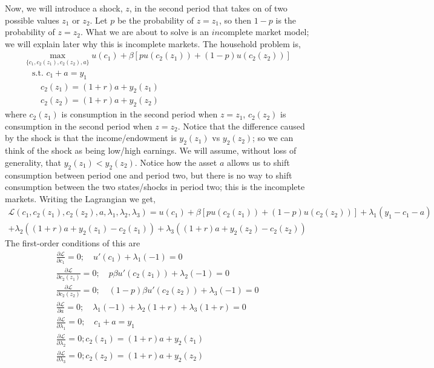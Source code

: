 Now, we will introduce a shock, $z$, in the second period that takes on of two possible values $z_1$ or $z_2$. Let $p$ be the probability of $z=z_1$, so then $1-p$ is the probability of $z=z_2$. What we are about to solve is an $in$complete market model; we will explain later why this is incomplete markets. The household problem is,
\begin{eqnarray*}
 \max_{\{c_1,c_2(z_1),c_2(z_2),a\}} u(c_1)+\beta [p u(c_2(z_1)) +(1-p)u(c_2(z_2))]\\
 \quad \text{s.t. } c_1+a=y_1 \\
 \quad \quad c_2(z_1)=(1+r)a+y_2(z_1) \\
 \quad \quad c_2(z_2)=(1+r)a+y_2(z_2)
\end{eqnarray*}
where $c_2(z_1)$ is consumption in the second period when $z=z_1$, $c_2(z_2)$ is consumption in the second period when $z=z_2$. Notice that the difference caused by the shock is that the income/endowment is $y_2(z_1)$ vs $y_2(z_2)$; so we can think of the shock as being low/high earnings. We will assume, without loss of generality, that $y_2(z_1)<y_2(z_2)$. Notice how the asset $a$ allows us to shift consumption between period one and period two, but there is no way to shift consumption between the two states/shocks in period two; this is the incomplete markets. Writing the Lagrangian we get,
\begin{eqnarray*}
 \mathcal{L}(c_1,c_2(z_1),c_2(z_2),a,\lambda_1,\lambda_2,\lambda_3)= u(c_1)+\beta [p u(c_2(z_1)) +(1-p)u(c_2(z_2))] + \lambda_1(y_1-c_1-a) \\
 +\lambda_2((1+r)a+y_2(z_1)-c_2(z_1)) +\lambda_3((1+r)a+y_2(z_2)-c_2(z_2))
\end{eqnarray*}
The first-order conditions of this are
\begin{eqnarray*}
 \frac{\partial \mathcal{L}}{\partial c_1}=0; \quad u'(c_1)+\lambda_1(-1)=0 \\
 \frac{\partial \mathcal{L}}{\partial c_2(z_1)}=0; \quad p \beta u'(c_2(z_1))+\lambda_2(-1)=0 \\
 \frac{\partial \mathcal{L}}{\partial c_2(z_2)}=0; \quad (1-p) \beta u'(c_2(z_2))+\lambda_3(-1)=0 \\
 \frac{\partial \mathcal{L}}{\partial a}=0; \quad \lambda_1(-1)+\lambda_2 (1+r)+\lambda_3 (1+r)=0 \\
 \frac{\partial \mathcal{L}}{\partial \lambda_1}=0; \quad c_1+a=y_1 \\
 \frac{\partial \mathcal{L}}{\partial \lambda_2}=0; c_2(z_1)=(1+r)a+y_2(z_1) \\
 \frac{\partial \mathcal{L}}{\partial \lambda_3}=0; c_2(z_2)=(1+r)a+y_2(z_2)
\end{eqnarray*}

